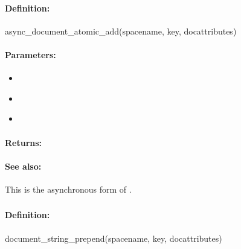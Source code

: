 \paragraph{Definition:}
\begin{rubycode}
async_document_atomic_add(spacename, key, docattributes)
\end{rubycode}

\paragraph{Parameters:}
\begin{itemize}[noitemsep]
\item {}\\

\item {}\\

\item {}\\

\end{itemize}

\paragraph{Returns:}


\paragraph{See also:}  This is the asynchronous form of .

\pagebreak
\subsubsection{}
\label{api:ruby:document_string_prepend}


\paragraph{Definition:}
\begin{rubycode}
document_string_prepend(spacename, key, docattributes)
\end{rubycode}

